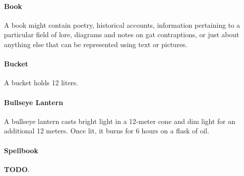     \paragraph{Book}
        A book might contain poetry, historical accounts, information pertaining to a particular field of lore, diagrams and notes on gat contraptions, or just about anything else that can be represented using text or pictures.
    \paragraph{Bucket}
        A bucket holds 12 liters.
    \paragraph{Bullseye Lantern}
        A bullseye lantern casts bright light in a 12-meter cone and dim light for an additional 12 meters.
        Once lit, it burns for 6 hours on a flask of oil.

\paragraph{Spellbook} \label{item::spellbook}
    \textbf{TODO}.
